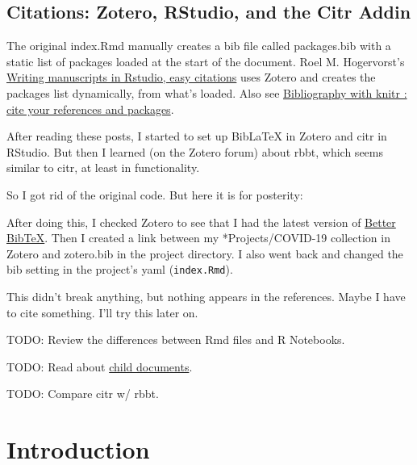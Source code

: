 \documentclass[
  12pt,
]{book}
\begin{document}
\hypertarget{citations-zotero-rstudio-and-the-citr-addin}{%
\section{Citations: Zotero, RStudio, and the Citr Addin}\label{citations-zotero-rstudio-and-the-citr-addin}}

The original index.Rmd manually creates a bib file called packages.bib with a static list of packages
loaded at the start of the document.
Roel M. Hogervorst's \href{https://www.r-bloggers.com/writing-manuscripts-in-rstudio-easy-citations/}{Writing manuscripts in Rstudio, easy citations} uses Zotero
and creates the packages list dynamically, from what's loaded.
Also see \href{http://r.iresmi.net/2019/02/02/bibliography-with-knitr-cite-your-references-and-packages/}{Bibliography with knitr : cite your references and packages}.

After reading these posts, I started to set up BibLaTeX in Zotero and citr in RStudio. But then I learned (on the Zotero forum) about rbbt, which seems similar to citr, at least in functionality.

So I got rid of the original code. But here it is for posterity:

After doing this, I checked Zotero to see that I had the latest version of \href{https://github.com/retorquere/zotero-better-bibtex}{Better BibTeX}. Then I created a link between my *Projects/COVID-19 collection in Zotero and zotero.bib in the project directory. I also went back and changed the bib setting in the project's yaml (\texttt{index.Rmd}).

This didn't break anything, but nothing appears in the references. Maybe I have to cite something. I'll try this later on.

TODO: Review the differences between Rmd files and R Notebooks.

TODO: Read about \href{https://yihui.org/knitr/demo/child/}{child documents}.

TODO: Compare citr w/ rbbt.

\hypertarget{introduction}{%
\chapter{Introduction}\label{introduction}}
\end{document}
